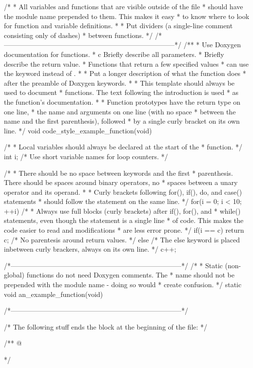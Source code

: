 \begin{DoxyCodeInclude}
{/*
 * All variables and functions that are visible outside of the file
 * should have the module name prepended to them. This makes it easy
 * to know where to look for function and variable definitions.
 *
 * Put dividers (a single-line comment consisting only of dashes)
 * between functions.
 */
/*---------------------------------------------------------------------------*/
/**
 * \brief      Use Doxygen documentation for functions.
 * \param c    Briefly describe all parameters.
 * \return     Briefly describe the return value.
 *    Functions that return a few specified values
 *    can use the \retval keyword instead of \return.
 *
 *             Put a longer description of what the function does
 *             after the preamble of Doxygen keywords.
 *
 *             This template should always be used to document
 *             functions. The text following the introduction is used
 *             as the function's documentation.
 *
 *             Function prototypes have the return type on one line,
 *             the name and arguments on one line (with no space
 *             between the name and the first parenthesis), followed
 *             by a single curly bracket on its own line.
 */
void
code_style_example_function(void)
{
  /*
   * Local variables should always be declared at the start of the
   * function.
   */
  int i;                   /* Use short variable names for loop
                              counters. */

  /*
   * There should be no space between keywords and the first
   * parenthesis. There should be spaces around binary operators, no
   * spaces between a unary operator and its operand.
   *
   * Curly brackets following for(), if(), do, and case() statements
   * should follow the statement on the same line.
   */
  for(i = 0; i < 10; ++i) {
    /*
     * Always use full blocks (curly brackets) after if(), for(), and
     * while() statements, even though the statement is a single line
     * of code. This makes the code easier to read and modifications
     * are less error prone.
     */
    if(i == c) {
      return c;           /* No parentesis around return values. */
    } else {              /* The else keyword is placed inbetween
                             curly brackers, always on its own line. */
      c++;
    }
  }
}
/*---------------------------------------------------------------------------*/
/*
 * Static (non-global) functions do not need Doxygen comments. The
 * name should not be prepended with the module name - doing so would
 * create confusion.
 */
static void
an_example_function(void)
{

}
/*---------------------------------------------------------------------------*/

/* The following stuff ends the  block at the beginning of
   the file: */

/** @} */
\end{DoxyCodeInclude}
 